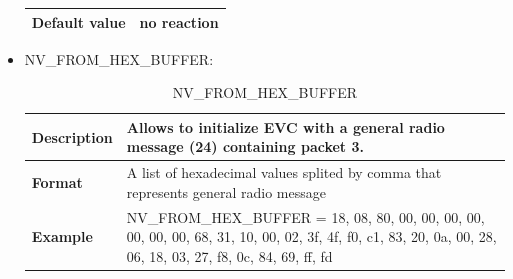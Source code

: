 \documentclass{template/openetcs}
\begin{document}
\begin{itemize}
\begin{longtable}{|l|l|}
				\hline
										
					\begin{minipage}[t]{0.22\linewidth} \textbf{Default value}	\end{minipage} 
				&	\begin{minipage}[t]{0.78\linewidth} no reaction \end{minipage} \\
				
				\hline
				
			\end{longtable}
			
		\item NV\_FROM\_HEX\_BUFFER:
		
			\begin{longtable}{|l|l|}
				\caption{NV\_FROM\_HEX\_BUFFER}\\ 																																
				\hline
				
					\begin{minipage}[t]{0.22\linewidth} \textbf{Description}	\end{minipage} 
				&	\begin{minipage}[t]{0.78\linewidth} Allows to initialize EVC with a general radio message (24) containing packet 3. \end{minipage} \\
				
				\hline
				
					\begin{minipage}[t]{0.22\linewidth} \textbf{Format}	\end{minipage} 
				&	\begin{minipage}[t]{0.78\linewidth}A list of hexadecimal values splited by comma that represents general radio message\end{minipage} \\
				
				\hline
																																									
					\begin{minipage}[t]{0.22\linewidth} \textbf{Example}	\end{minipage} 
				&	\begin{minipage}[t]{0.78\linewidth} NV\_FROM\_HEX\_BUFFER = 18, 08, 80, 00, 00, 00, 00, 00, 00, 00, 68, 31, 10, 00, 02, 3f, 4f, f0, c1, 83, 20, 0a, 00, 28, 06, 18, 03, 27, f8, 0c, 84, 69, ff, fd \end{minipage} \\	
						
				\hline
										

\end{longtable}
\end{itemize}
\end{document}
